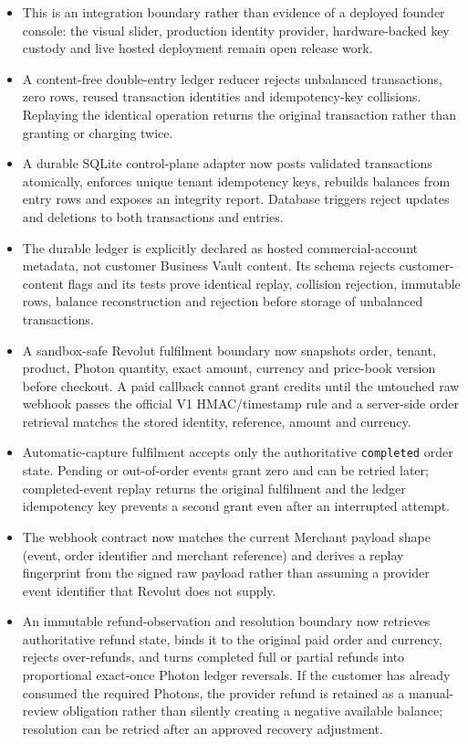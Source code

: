\documentclass[11pt]{article}
\newcommand{\code}[1]{\texttt{#1}}
\begin{document}
\begin{itemize}
  \item This is an integration boundary rather than evidence of a deployed founder console: the visual slider, production identity provider, hardware-backed key custody and live hosted deployment remain open release work.
  \item A content-free double-entry ledger reducer rejects unbalanced transactions, zero rows, reused transaction identities and idempotency-key collisions. Replaying the identical operation returns the original transaction rather than granting or charging twice.
  \item A durable SQLite control-plane adapter now posts validated transactions atomically, enforces unique tenant idempotency keys, rebuilds balances from entry rows and exposes an integrity report. Database triggers reject updates and deletions to both transactions and entries.
  \item The durable ledger is explicitly declared as hosted commercial-account metadata, not customer Business Vault content. Its schema rejects customer-content flags and its tests prove identical replay, collision rejection, immutable rows, balance reconstruction and rejection before storage of unbalanced transactions.
  \item A sandbox-safe Revolut fulfilment boundary now snapshots order, tenant, product, Photon quantity, exact amount, currency and price-book version before checkout. A paid callback cannot grant credits until the untouched raw webhook passes the official V1 HMAC/timestamp rule and a server-side order retrieval matches the stored identity, reference, amount and currency.
  \item Automatic-capture fulfilment accepts only the authoritative \code{completed} order state. Pending or out-of-order events grant zero and can be retried later; completed-event replay returns the original fulfilment and the ledger idempotency key prevents a second grant even after an interrupted attempt.
  \item The webhook contract now matches the current Merchant payload shape (event, order identifier and merchant reference) and derives a replay fingerprint from the signed raw payload rather than assuming a provider event identifier that Revolut does not supply.
  \item An immutable refund-observation and resolution boundary now retrieves authoritative refund state, binds it to the original paid order and currency, rejects over-refunds, and turns completed full or partial refunds into proportional exact-once Photon ledger reversals. If the customer has already consumed the required Photons, the provider refund is retained as a manual-review obligation rather than silently creating a negative available balance; resolution can be retried after an approved recovery adjustment.

\end{itemize}
\end{document}
